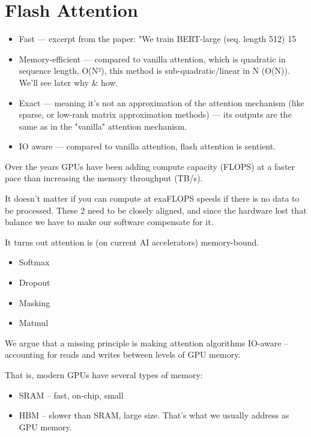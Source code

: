 \chapter{Flash Attention}

\begin{itemize}
	\item    Fast — excerpt from the paper: "We train BERT-large (seq. length 512) 15%
	\item Memory-efficient — compared to vanilla attention, which is quadratic in sequence length, O(N²), this method is sub-quadratic/linear in N (O(N)). We'll see later why & how.
	\item Exact — meaning it's not an approximation of the attention mechanism (like \eg sparse, or low-rank matrix approximation methods) — its outputs are the same as in the "vanilla" attention mechanism.
	\item IO aware — compared to vanilla attention, flash attention is sentient.
\end{itemize}

Over the years GPUs have been adding compute capacity (FLOPS) at a faster pace than increasing the memory throughput (TB/s).

It doesn't matter if you can compute at exaFLOPS speeds if there is no data to be processed. These 2 need to be closely aligned, and since the hardware lost that balance we have to make our software compensate for it.

It turns out attention is (on current AI accelerators) memory-bound.
\begin{itemize}
	\item Softmax
	\item Dropout
	\item Masking
	\item Matmul
\end{itemize}



We argue that a missing principle is making attention algorithms IO-aware – accounting for reads and writes between levels of GPU memory.


That is, modern GPUs have several types of memory:
\begin{itemize}
	\item SRAM – fast, on-chip, small
	\item HBM – slower than SRAM, large size. That's what we usually address as GPU memory.
\end{itemize}

